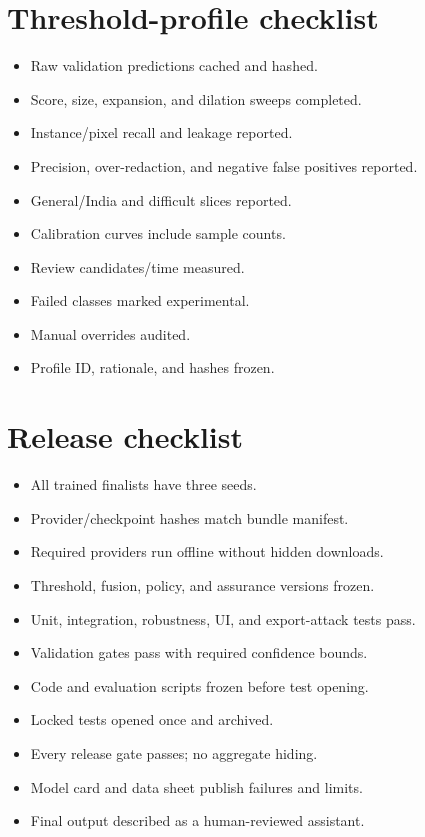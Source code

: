 \section{Threshold-profile checklist}

\begin{itemize}[label=$\square$,leftmargin=8mm]
  \item Raw validation predictions cached and hashed.
  \item Score, size, expansion, and dilation sweeps completed.
  \item Instance/pixel recall and leakage reported.
  \item Precision, over-redaction, and negative false positives reported.
  \item General/India and difficult slices reported.
  \item Calibration curves include sample counts.
  \item Review candidates/time measured.
  \item Failed classes marked experimental.
  \item Manual overrides audited.
  \item Profile ID, rationale, and hashes frozen.
\end{itemize}

\section{Release checklist}

\begin{itemize}[label=$\square$,leftmargin=8mm]
  \item All trained finalists have three seeds.
  \item Provider/checkpoint hashes match bundle manifest.
  \item Required providers run offline without hidden downloads.
  \item Threshold, fusion, policy, and assurance versions frozen.
  \item Unit, integration, robustness, UI, and export-attack tests pass.
  \item Validation gates pass with required confidence bounds.
  \item Code and evaluation scripts frozen before test opening.
  \item Locked tests opened once and archived.
  \item Every release gate passes; no aggregate hiding.
  \item Model card and data sheet publish failures and limits.
  \item Final output described as a human-reviewed assistant.
\end{itemize}

